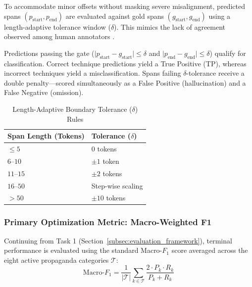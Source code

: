 \documentclass[12pt, a4paper]{article}
\begin{document}
To accommodate minor offsets without masking severe misalignment, predicted spans $(p_{\text{start}}, p_{\text{end}})$ are evaluated against gold spans $(g_{\text{start}}, g_{\text{end}})$ using a length-adaptive tolerance window ($\delta$). This mimics the lack of agreement observed among human annotators \cite{dasan2019}.

Predictions passing the gate ($\vert p_{\text{start}} - g_{\text{start}} \vert \le \delta$ and $\vert p_{\text{end}} - g_{\text{end}} \vert \le \delta$) qualify for classification. Correct technique predictions yield a True Positive (TP), whereas incorrect techniques yield a misclassification. Spans failing $\delta$-tolerance receive a double penalty—scored simultaneously as a False Positive (hallucination) and a False Negative (omission).

\begin{table}[htbp]
  \centering
  \caption{Length-Adaptive Boundary Tolerance ($\delta$) Rules}
  \label{tab:boundary_tolerance}
  \small
  \setlength{\tabcolsep}{12pt}
  \begin{tabularx}{0.65\textwidth}{l >{\centering\arraybackslash}X}
    \toprule
    \textbf{Span Length (Tokens)} & \textbf{Tolerance ($\delta$)} \\
    \midrule
    \textbf{$\le 5$} & $0$ tokens \\
    \addlinespace
    \textbf{$6\text{--}10$} & $\pm 1$ token \\
    \addlinespace
    \textbf{$11\text{--}15$} & $\pm 2$ tokens \\
    \addlinespace
    \textbf{$16\text{--}50$} & Step-wise scaling \\
    \addlinespace
    \textbf{$> 50$} & $\pm 10$ tokens \\
    \bottomrule
  \end{tabularx}
\end{table}

\subsubsection{Primary Optimization Metric: Macro-Weighted F1}
\label{subsubsec:task2_primary_metric}

Continuing from Task 1 (Section~\ref{subsec:evaluation_framework}), terminal performance is evaluated using the standard Macro-$F_1$ score averaged across the eight active propaganda categories $\mathcal{T}$:
\[
\text{Macro-}F_1 = \frac{1}{\vert \mathcal{T} \vert} \sum_{k \in \mathcal{T}} \frac{2 \cdot P_k \cdot R_k}{P_k + R_k}
\]
\end{document}
